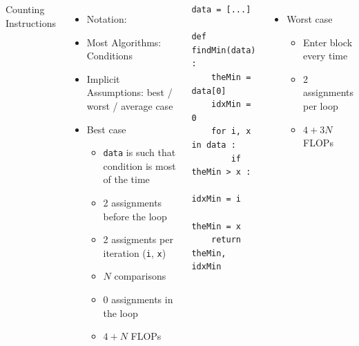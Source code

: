 \begin{frame}[fragile]
%
\begin{columns}[T]
\begin{Large}
	{Counting Instructions}
	\vspace{6pt}
\end{Large}
%
\begin{itemize}
\item Notation: 
\item Most Algorithms: Conditions
\item Implicit Assumptions: best / worst / average case
\item Best case
	\begin{itemize}
	\item \texttt{data} is such that  condition is  most of the time
	\item 2 assignments before the loop
	\item 2 assigments per iteration (\texttt{i}, \texttt{x})
	\item $N$ comparisons
	\item 0 assignments in the loop
	\item[\Thus] $4 + N$ FLOPs
	\end{itemize}
\end{itemize}
%
\begin{codebox}
\begin{verbatim}
data = [...]

def findMin(data) :
    theMin = data[0]
    idxMin = 0
    for i, x in data :
        if theMin > x :
            idxMin = i
            theMin = x
    return theMin, idxMin
\end{verbatim}
\end{codebox}
%
\begin{itemize}
\item Worst case
	\begin{itemize}
	\item Enter  block every time
	\item 2 assignments per loop
	\item[\Thus] $4 + 3N$ FLOPs
	\end{itemize}
\end{itemize}
\end{columns}
%
\end{frame}


